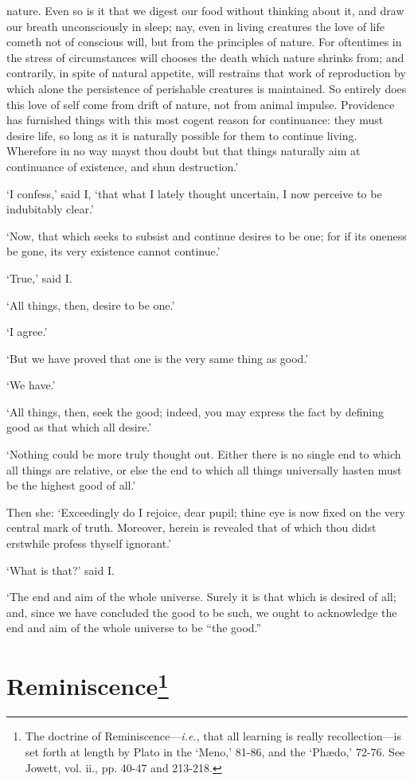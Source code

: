 \documentclass[12pt]{book}
\begin{document}
nature. Even so is it that we digest our food without thinking about it,
and draw our breath unconsciously in sleep; nay, even in living
creatures the love of life cometh not of conscious will, but from the
principles of nature. For oftentimes in the stress of circumstances will
chooses the death which nature shrinks from; and contrarily, in spite of
natural appetite, will restrains that work of reproduction by which
alone the persistence of perishable creatures is maintained. So entirely
does this love of self come from drift of nature, not from animal
impulse. Providence has furnished things with this most cogent reason
for continuance: they must desire life, so long as it is naturally
possible for them to continue living. Wherefore in no way mayst thou
doubt but that things naturally aim at continuance of existence, and
shun destruction.'

`I confess,' said I, `that what I lately thought uncertain, I now
perceive to be indubitably clear.'

`Now, that which seeks to subsist and continue desires to be one; for if
its oneness be gone, its very existence cannot continue.'

`True,' said I.

`All things, then, desire to be one.'

`I agree.'

`But we have proved that one is the very same thing as good.'

`We have.'

`All things, then, seek the good; indeed, you may express the fact by
defining good as that which all desire.'

`Nothing could be more truly thought out. Either there is no single end
to which all things are relative, or else the end to which all things
universally hasten must be the highest good of all.'

Then she: `Exceedingly do I rejoice, dear pupil; thine eye is now fixed
on the very central mark of truth. Moreover, herein is revealed that of
which thou didst erstwhile profess thyself ignorant.'

`What is that?' said I.

`The end and aim of the whole universe. Surely it is that which is
desired of all; and, since we have concluded the good to be such, we
ought to acknowledge the end and aim of the whole universe to be ``the
good.''



\section{Reminiscence\footnote{The doctrine of
Reminiscence---\emph{i.e.}, that all learning is really recollection---is
set forth at length by Plato in the `Meno,' 81-86, and the `Phædo,'
72-76. See Jowett, vol. ii., pp. 40-47 and 213-218.}}
\end{document}
